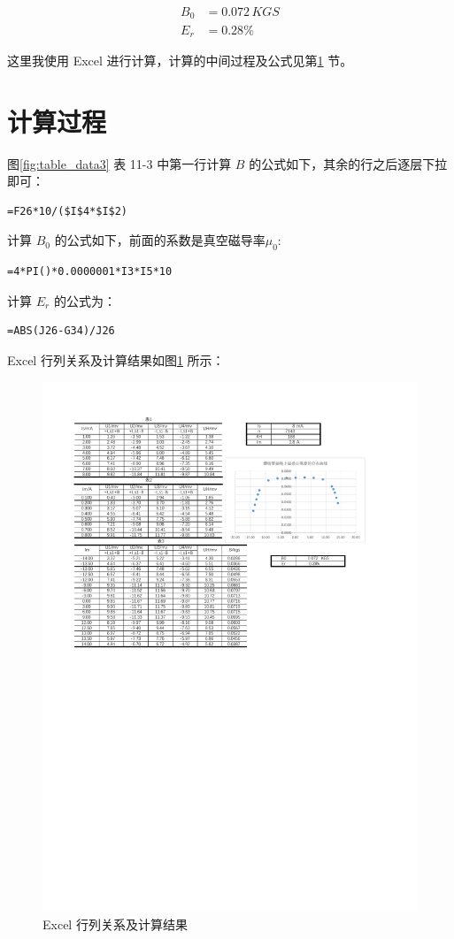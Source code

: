 \documentclass[12pt]{article}
\begin{document}
\begin{align*}
B_0 &= 0.072 \, \text{$KGS$} \\
E_r &= 0.28\%
\end{align*}

这里我使用 Excel 进行计算，计算的中间过程及公式见第\ref{sec:calculation_process} 节。



\section{\normalfont 计算过程}
\label{sec:calculation_process}

图\ref{fig:table_data3} 表 11-3 中第一行计算 $B$ 的公式如下，其余的行之后逐层下拉即可：
\begin{Verbatim}[frame=single, fontsize=\small]
    =F26*10/($I$4*$I$2)
\end{Verbatim}


计算 $B_0$ 的公式如下，前面的系数是真空磁导率$\mu _0$:

\begin{Verbatim}[frame=single, fontsize=\small]
    =4*PI()*0.0000001*I3*I5*10
\end{Verbatim}

计算 $E_r$ 的公式为：
\begin{Verbatim}[frame=single, fontsize=\small]
    =ABS(J26-G34)/J26
\end{Verbatim}

Excel 行列关系及计算结果如图\ref{fig:final_table} 所示：
\begin{figure}[H] %
    \centering
    \includegraphics[width=\textwidth]{./figures/佐证材料.pdf} 
    \caption{Excel 行列关系及计算结果}
    \label{fig:final_table}
\end{figure}
\end{document}
